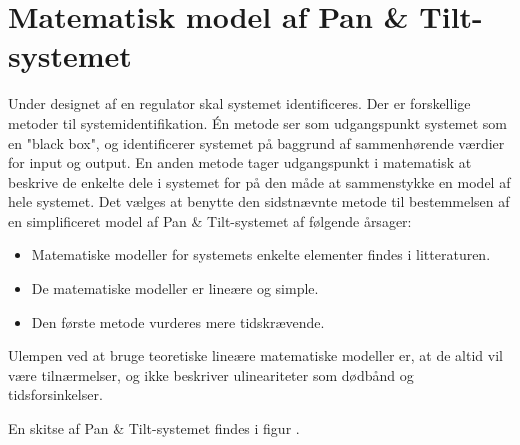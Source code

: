 \section{Matematisk model af Pan \& Tilt-systemet}
Under designet af en regulator skal systemet identificeres. Der er forskellige metoder til systemidentifikation.
Én metode ser som udgangspunkt systemet som en "black box", og identificerer systemet
på baggrund af sammenhørende værdier for input og output.
En anden metode tager udgangspunkt i matematisk at beskrive de enkelte dele i systemet
for på den måde at sammenstykke en model af hele systemet.
Det vælges at benytte den sidstnævnte metode til bestemmelsen af en simplificeret
model af Pan \& Tilt-systemet af følgende årsager:
\begin{itemize}
\item Matematiske modeller for systemets enkelte elementer findes i litteraturen.
\item De matematiske modeller er lineære og simple.
\item Den første metode vurderes mere tidskrævende.
\end{itemize}
Ulempen ved at bruge teoretiske lineære matematiske modeller er,
at de altid vil være tilnærmelser, og ikke beskriver ulineariteter som dødbånd og tidsforsinkelser.

En skitse af Pan \& Tilt-systemet findes i figur .


